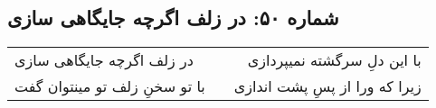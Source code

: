 \begin{center}
\section*{شماره ۵۰: در زلف اگرچه جایگاهی سازی}
\label{sec:050}
\begin{longtable}{l p{0.5cm} r}
در زلف اگرچه جایگاهی سازی
&&
با این دلِ سرگشته نمیپردازی
\\
با تو سخنِ زلف تو مینتوان گفت
&&
زیرا که ورا از پسِ پشت اندازی
\\
\end{longtable}
\end{center}
